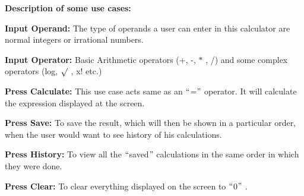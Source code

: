 \documentclass[12pt]{article}
\begin{document}
\vspace{\baselineskip}

\vspace{\baselineskip}

\vspace{\baselineskip}

\vspace{\baselineskip}

\vspace{\baselineskip}

\vspace{\baselineskip}

\vspace{\baselineskip}
\begin{justify}
\textbf{Description of some use cases: }
\end{justify}\par

\begin{justify}
\textbf{Input Operand: }The type of operands a user can enter in this calculator are normal integers or irrational numbers.
\end{justify}\par

\begin{justify}
\textbf{Input Operator: }Basic Arithmetic operators (+, -, $\ast$ , /) and some complex operators (log, $ \surd$ , x! etc.)
\end{justify}\par

\begin{justify}
\textbf{Press Calculate: }This use case acts same as an $``$=$"$  operator. It will calculate the expression displayed at the screen.
\end{justify}\par

\begin{justify}
\textbf{Press Save: }To save the result, which will then be shown in a particular order, when the user would want to see history of his calculations.
\end{justify}\par

\begin{justify}
\textbf{Press History: }To view all the $``$saved$"$  calculations in the same order in which they were done.
\end{justify}\par

\begin{justify}
\textbf{Press Clear: }To clear everything displayed on the screen to $``$0$"$ .
\end{justify}\par
\end{document}
